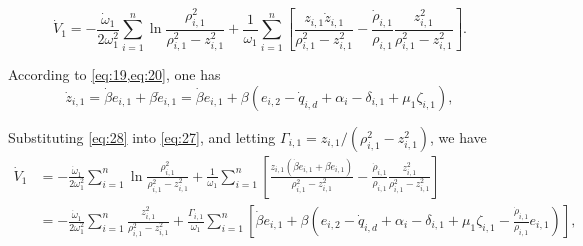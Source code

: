 \documentclass[pdflatex,sn-mathphys-num]{sn-jnl}%
\theoremstyle{thmstyleone}%
\theoremstyle{thmstyletwo}%
\theoremstyle{thmstylethree}%
\begin{document}
	\begin{equation}\label{eq:27}
	\dot{V}_{1}=-\frac{\dot{\omega}_{1}}{2 \omega_{1}^{2}}\sum_{i=1}^{n}\ln \frac{\rho_{i,1}^{2}}{\rho_{i,1}^{2}-z_{i,1}^{2}}+\frac{1}{\omega_{1}} \sum_{i=1}^{n} \left[ \frac{z_{i,1} \dot{z}_{i,1}}{\rho_{i,1}^{2} - z_{i,1}^{2}} - \frac{\dot{\rho}_{i,1}}{\rho_{i,1}} \frac{z_{i,1}^{2}}{\rho_{i,1}^{2} - z_{i,1}^{2}} \right].
	\end{equation}

	According to \cref{eq:19,eq:20}, one has
	\begin{equation}	\label{eq:28}
	\dot{z}_{i,1} = \dot{\beta} e_{i,1} + \beta \dot{e}_{i,1}=\dot{\beta} e_{i,1} + \beta (e_{i,2}-\dot q_{i,d}+\alpha_{i}-\delta_{i,1}+\mu_1 \zeta_{i,1}),
	\end{equation}

	Substituting \cref{eq:28} into \cref{eq:27}, and letting $\varGamma_{i,1} = {z_{i,1}}/({\rho_{i,1}^2 - z_{i,1}^2})$, we have
	\begin{equation}	\label{eq:29}
			\begin{aligned}
			\dot{V}_{1} &= -\frac{\dot{\omega}_{1}}{2 \omega_{1}^{2}}\sum_{i=1}^{n}\ln\frac{\rho_{i,1}^{2}}{\rho_{i,1}^{2}-z_{i,1}^{2}}+\frac{1}{\omega_{1}}\sum_{i=1}^{n} \left[ \frac{z_{i,1} (\dot{\beta} e_{i,1} + \beta \dot{e}_{i,1})}{\rho_{i,1}^{2} - z_{i,1}^{2}} - \frac{\dot{\rho}_{i,1}}{\rho_{i,1}} \frac{z_{i,1}^{2}}{\rho_{i,1}^{2} - z_{i,1}^{2}} \right] \\
			&=-\frac{\dot{\omega}_{1}}{2 \omega_{1}^{2}}\sum_{i=1}^{n}\frac{z_{i,1}^{2}}{\rho_{i,1}^{2}-z_{i,1}^{2}}+\frac{\varGamma_{i,1}}{\omega_{1}}\sum_{i=1}^{n} \left[\dot{\beta} e_{i,1}+\beta \left(e_{i,2}-\dot q_{i,d}+\alpha_{i}-\delta_{i,1}+\mu_1 \zeta_{i,1}- \frac{\dot{\rho}_{i,1}}{\rho_{i,1}}e_{i,1}\right)  \right],
		\end{aligned}
			\end{equation}
\end{document}

